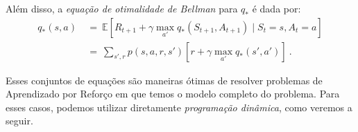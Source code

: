 \documentclass{article}
\begin{document}
            Além disso, a \emph{equação de otimalidade de Bellman} para $q_*$ é dada por:
            \begin{equation}
            \label{eq:optimal-action-value}
            \begin{split}
                q_*(s, a) & \ = \ \mathbb{E} [R_{t+1} + \gamma \max_{a'} q_*(S_{t+1}, A_{t+1}) \mid S_t = s, A_t = a] \\
                & \ = \ \sum_{s', r} p(s, a, r, s') [r + \gamma \max_{a'} q_*(s', a')]\ .
            \end{split}
            \end{equation}

            Esses conjuntos de equações são maneiras ótimas de resolver problemas de Aprendizado por Reforço em que temos o modelo completo do problema. Para esses casos, podemos utilizar diretamente \emph{programação dinâmica}, como veremos a seguir.
\end{document}
